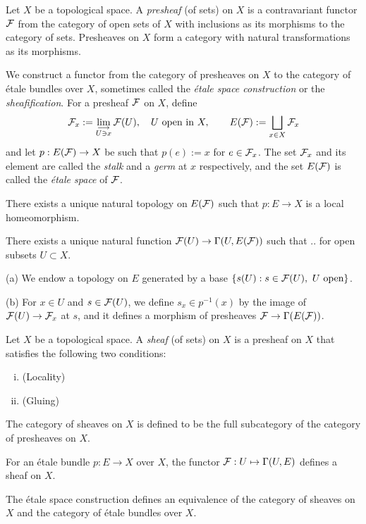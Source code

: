\documentclass{../../large}
\begin{document}
\begin{prb}[Presheaves]
Let $X$ be a topological space.
A \emph{presheaf} (of sets) on $X$ is a contravariant functor $\mathcal{F}$ from the category of open sets of $X$ with inclusions as its morphisms to the category of sets.
Presheaves on $X$ form a category with natural transformations as its morphisms.

We construct a functor from the category of presheaves on $X$ to the category of \'etale bundles over $X$, sometimes called the \emph{\'etale space construction} or the \emph{sheafification}.
For a presheaf $\mathcal{F}$ on $X$, define
\[\mathcal{F}_x:=\lim_{\substack{\longrightarrow\\U\ni x}}\mathcal{F}(U),\quad U\text{ open in }X,\qquad E(\mathcal{F}):=\bigsqcup_{x\in X}\mathcal{F}_x\]
and let $p:E(\mathcal{F})\to X$ be such that $p(e):=x$ for $e\in\mathcal{F}_x$.
The set $\mathcal{F}_x$ and its element are called the \emph{stalk} and a \emph{germ} at $x$ respectively, and the set $E(\mathcal{F})$ is called the \emph{\'etale space} of $\mathcal{F}$.
\begin{parts}
\item There exists a unique natural topology on $E(\mathcal{F})$ such that $p:E\to X$ is a local homeomorphism.
\item There exists a unique natural function $\mathcal{F}(U)\to\Gamma(U,E(\mathcal{F}))$ such that .. for open subsets $U\subset X$.
\end{parts}
\end{prb}
\begin{pf}
(a)
We endow a topology on $E$ generated by a base $\{s(U):s\in\cF(U),\ U\text{ open}\}$.

(b)
For $x\in U$ and $s\in\mathcal{F}(U)$, we define $s_x\in p^{-1}(x)$ by the image of $\mathcal{F}(U)\to\mathcal{F}_x$ at $s$, and it defines a morphism of presheaves $\mathcal{F}\to\Gamma(E(\mathcal{F}))$.
\end{pf}



\begin{prb}[Sheaves]
Let $X$ be a topological space.
A \emph{sheaf} (of sets) on $X$ is a presheaf on $X$ that satisfies the following two conditions:
\begin{enumerate}[(i)]
\item \hfill(Locality)
\item \hfill(Gluing)
\end{enumerate}
The category of sheaves on $X$ is defined to be the full subcategory of the category of presheaves on $X$.
\begin{parts}
\item For an \'etale bundle $p:E\to X$ over $X$, the functor $\mathcal{F}:U\mapsto\Gamma(U,E)$ defines a sheaf on $X$.
\item The \'etale space construction defines an equivalence of the category of sheaves on $X$ and the category of \'etale bundles over $X$.
\end{parts}
\end{prb}
\end{document}
